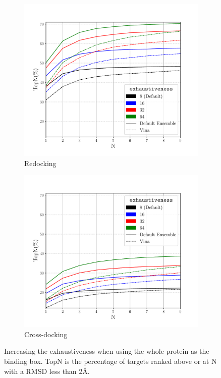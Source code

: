 \documentclass[journal=jcisd8,manuscript=article]{achemso}
\begin{document}
\begin{figure}    
        \begin{subfigure}[b]{0.48\textwidth}    
    		\centering
    		\includegraphics[width=\textwidth]{figures/redocking/whole_ptn_sweep_exhaustiveness_line.pdf}
    		\caption{Redocking}
            \label{fig:WholeProteinExhRD}
        \end{subfigure}    
        \begin{subfigure}[b]{0.48\textwidth}    
    		\centering
    		\includegraphics[width=\textwidth]{figures/crossdocking/whole_ptn_sweep_exhaustiveness_line.pdf}
    		\caption{Cross-docking}
            \label{fig:WholeProteinExhCD}
        \end{subfigure}    
	\caption{Increasing the exhaustiveness when using the whole protein as the binding box. TopN is the percentage of targets ranked above or at N with a RMSD less than 2{\AA}.}
        \label{fig:WholeProteinExh}
\end{figure}
\end{document}
